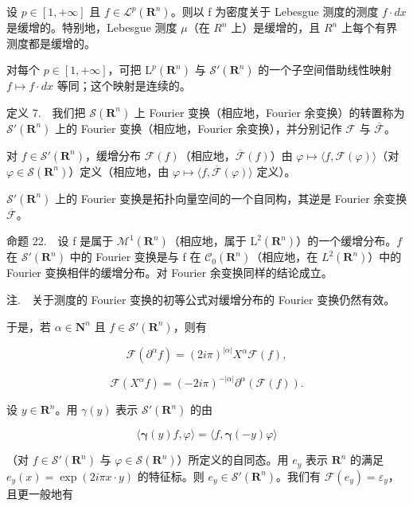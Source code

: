 设 \(p \in [1, +\infty]\) 且 \(f \in \mathcal{L}^{p}(\mathbf{R}^{n})\)。则以 f 为密度关于 Lebesgue 测度的测度 \(f \cdot dx\) 是缓增的。特别地，Lebesgue 测度 \(\mu\)（在 \(R^{n}\) 上）是缓增的，且 \(R^{n}\) 上每个有界测度都是缓增的。

对每个 \(p \in [1, +\infty]\)，可把 \(\mathrm{L}^{p}(\mathbf{R}^{n})\) 与 \(\mathcal{S}'(\mathbf{R}^{n})\) 的一个子空间借助线性映射 \(f \mapsto f \cdot dx\) 等同；这个映射是连续的。

定义 7.　我们把 \(\mathcal{S}(\mathbf{R}^n)\) 上 Fourier 变换（相应地，Fourier 余变换）的转置称为 \(\mathcal{S}'(\mathbf{R}^n)\) 上的 Fourier 变换（相应地，Fourier 余变换），并分别记作 \(\mathcal{F}\) 与 \(\overline{\mathcal{F}}\)。

对 \(f \in \mathcal{S}'(\mathbf{R}^n)\)，缓增分布 \(\mathcal{F}(f)\)（相应地，\(\overline{\mathcal{F}}(f)\)）由 \(\varphi \mapsto \langle f, \mathcal{F}(\varphi) \rangle\)（对 \(\varphi \in \mathcal{S}(\mathbf{R}^n)\)）定义（相应地，由 \(\varphi \mapsto \langle f, \overline{\mathcal{F}}(\varphi) \rangle\) 定义）。

\(\mathcal{S}'(\mathbf{R}^n)\) 上的 Fourier 变换是拓扑向量空间的一个自同构，其逆是 Fourier 余变换 \(\overline{\mathcal{F}}\)。

命题 22.　设 f 是属于 \(\mathcal{M}^{1}(\mathbf{R}^{n})\)（相应地，属于 \(\mathrm{L}^{2}(\mathbf{R}^{n})\)）的一个缓增分布。\(f\) 在 \(\mathcal{S}'(\mathbf{R}^{n})\) 中的 Fourier 变换是与 f 在 \(\mathcal{C}_{0}(\mathbf{R}^{n})\)（相应地，在 \(L^{2}(\mathbf{R}^{n})\)）中的 Fourier 变换相伴的缓增分布。对 Fourier 余变换同样的结论成立。

注.　关于测度的 Fourier 变换的初等公式对缓增分布的 Fourier 变换仍然有效。

于是，若 \(\alpha \in \mathbf{N}^n\) 且 \(f\in \mathcal{S}'(\mathbf{R}^n)\)，则有

\[
\mathcal {F} (\partial^ {\alpha} f) = (2 i \pi) ^ {| \alpha |} X ^ {\alpha} \mathcal {F} (f),
\]

\[
\mathcal {F} (X ^ {\alpha} f) = (- 2 i \pi) ^ {- | \alpha |} \partial^ {\alpha} (\mathcal {F} (f)).
\]

设 \(y \in \mathbf{R}^n\)。用 \(\gamma(y)\) 表示 \(\mathcal{S}'(\mathbf{R}^n)\) 的由

\[
\langle \boldsymbol {\gamma} (y) f, \varphi \rangle = \langle f, \boldsymbol {\gamma} (- y) \varphi \rangle
\]

（对 \(f \in \mathcal{S}'(\mathbf{R}^n)\) 与 \(\varphi \in \mathcal{S}(\mathbf{R}^n)\)）所定义的自同态。用 \(e_y\) 表示 \(\mathbf{R}^n\) 的满足 \(e_y(x) = \exp(2i\pi x \cdot y)\) 的特征标。则 \(e_y \in \mathcal{S}'(\mathbf{R}^n)\)。我们有 \(\mathcal{F}(e_y) = \varepsilon_y\)，且更一般地有

